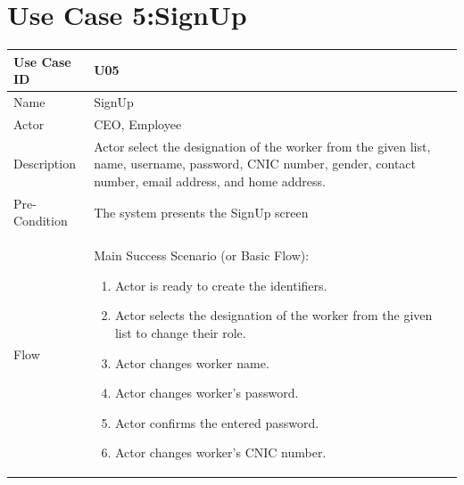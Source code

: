 \documentclass[12pt,a4paper]{report}
\begin{document}
\section{Use Case 5:SignUp}
\begin{tabular}{ | m{3cm} | m{12cm}| } \hline
Use Case ID & U05   \\\hline
Name  &  SignUp \\ \hline
Actor &    CEO, Employee \\ \hline
Description & Actor select the designation of the worker from the given list, name, username, password, CNIC number, gender, contact number, email address, and home address.\\ \hline
Pre-Condition & The system presents the SignUp screen \\\hline
Flow & Main Success Scenario (or Basic Flow):
\begin{enumerate}
\item Actor is ready to create the identifiers.   
\item Actor selects the designation of the worker from the given list to change their role. 
\item Actor changes worker name.
\item Actor changes worker's password.
\item Actor confirms the entered password.
\item Actor changes worker's CNIC number.
\end{enumerate}\\ \hline
\end{tabular}
\end{document}
